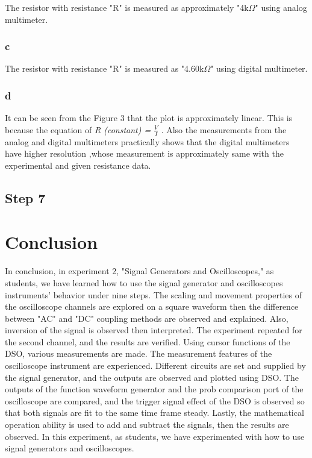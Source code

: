 \documentclass[letterpaper,12pt]{article}
\begin{document}
The resistor with resistance "R" is measured as approximately "4k\(\Omega\)" using analog multimeter.
\subsubsection{c}

The resistor with resistance "R" is measured as  "4.60k\(\Omega\)" using digital multimeter.

\subsubsection{d}
It can be seen from the Figure 3 that the plot is approximately linear. This is because the equation of  \emph{ R (constant) = \(\frac{V}{I}\) } . Also the measurements from the analog and digital multimeters practically shows that the digital multimeters have higher resolution ,whose measurement is approximately same with the experimental and given resistance data.

\subsection{Step 7}



\section{Conclusion}
In conclusion, in experiment 2, "Signal Generators and Oscilloscopes," as students, we have learned how to use the signal generator and oscilloscopes instruments' behavior under nine steps. The scaling and movement properties of the oscilloscope channels are explored on a square waveform then the difference between "AC" and "DC" coupling methods are observed and explained. Also, inversion of the signal is observed then interpreted. The experiment repeated for the second channel, and the results are verified. Using cursor functions of the DSO, various measurements are made. The measurement features of the oscilloscope instrument are experienced. Different circuits are set and supplied by the signal generator, and the outputs are observed and plotted using DSO. The outputs of the function waveform generator and the prob comparison port of the oscilloscope are compared, and the trigger signal effect of the DSO is observed so that both signals are fit to the same time frame steady. Lastly, the mathematical operation ability is used to add and subtract the signals, then the results are observed.  In this experiment, as students, we have experimented with how to use signal generators and oscilloscopes.
\end{document}
